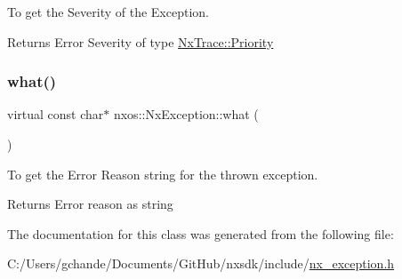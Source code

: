 To get the Severity of the Exception.

\begin{DoxyReturn}{Returns}
Error Severity of type \mbox{\hyperlink{classnxos_1_1_nx_trace_a582f6e5a22e788c61807657f8bca088f}{Nx\+Trace\+::\+Priority}} 
\end{DoxyReturn}
\mbox{\label{classnxos_1_1_nx_exception_ad475b90fb193848245b9537524439943}} 
\subsubsection{\texorpdfstring{what()}{what()}}
{\footnotesize\ttfamily virtual const char$\ast$ nxos\+::\+Nx\+Exception\+::what (\begin{DoxyParamCaption}{ }\end{DoxyParamCaption})\hspace{0.3cm}{\ttfamily [pure virtual]}}

To get the Error Reason string for the thrown exception.

\begin{DoxyReturn}{Returns}
Error reason as string 
\end{DoxyReturn}


The documentation for this class was generated from the following file\+:\begin{DoxyCompactItemize}
\item 
C\+:/\+Users/gchande/\+Documents/\+Git\+Hub/nxsdk/include/\mbox{\hyperlink{nx__exception_8h}{nx\+\_\+exception.\+h}}\end{DoxyCompactItemize}

